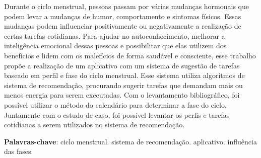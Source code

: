 \begin{resumo}

    Durante o ciclo menstrual, pessoas passam por várias mudanças hormonais que podem levar a 
    mudanças de humor, comportamento e sintomas físicos. Essas mudanças podem influenciar  
    positivamente ou negativamente a realização de certas tarefas cotidianas. Para 
    ajudar no autoconhecimento, melhorar a inteligência emocional 
    dessas pessoas e possibilitar que elas utilizem dos benefícios e lidem com os 
    malefícios 
    de forma saudável e consciente, esse trabalho propõe a 
    realização de um aplicativo com um sistema de sugestão de tarefas baseado em 
    perfil e fase do ciclo menstrual. Esse sistema utiliza algoritmos de sistema 
    de recomendação, procurando sugerir tarefas 
    que demandam mais ou menos energia para serem executadas. Com o levantamento bibliográfico, 
    foi possível utilizar o método do calendário para determinar a fase do ciclo. Juntamente com o 
    estudo de caso, foi possível levantar os perfis e tarefas cotidianas a serem utilizados no sistema de 
    recomendação.
    
     \vspace{\onelineskip}
        
     \noindent
     \textbf{Palavras-chave}: ciclo menstrual. sistema de recomendação. aplicativo. influência das fases.
    \end{resumo}
    